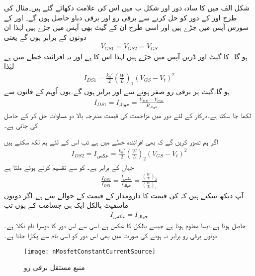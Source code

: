 شکل  الف میں  کا سادہ دور اور شکل  ب میں اس کی علامت دکھائے گئے ہیں۔مثال  کی طرح  اور  کے دور کو حل کرنے سے برقی رو  اور برقی دباو  حاصل ہوں گے۔ اور  کے سورس آپس میں جڑے ہیں اور اسی طرح ان کے گیٹ بھی آپس میں جڑے ہیں لہٰذا ان دونوں کے  برابر ہوں گے یعنی
\begin{align*}
V_{GS1}=V_{GS2}=V_{GS}
\end{align*}
ہو گا۔ کا گیٹ اور ڈرین آپس میں جڑے ہیں لہٰذا اس کا  ہے اور یہ افزائندہ خطے میں ہے لہٰذا
\begin{align}\label{مساوات_ماسفیٹ_مستقل_برقی_رو_الف}
I_{DS1}=\frac{k_n'}{2} \left(\frac{W}{L}\right)_1 \left(V_{GS}-V_t \right)^2
\end{align}
ہو گا۔گیٹ پر برقی رو صفر ہونے سے  اور  برابر ہوں گے۔یوں اُوہم کے قانون سے
\begin{align}\label{مساوات_ماسفیٹ_مستقل_برقی_رو_ب}
I_{DS1}=I_{\text{حوالہ}}=\frac{V_{DD}-V_{GS1}}{R_{\text{حوالہ}}}
\end{align}
لکھا جا سکتا ہے۔درکار  کے لئے دور میں مزاحمت  کی قیمت مندرجہ بالا دو مساوات حل کر کے  حاصل کی جاتی ہے۔

اگر ہم تصور کریں گے کہ  بھی افزائندہ خطے میں ہے تب اس کے لئے ہم لکھ سکتے ہیں
\begin{align}
I_{DS2}=I_{\text{عکس}}=\frac{k_n'}{2} \left(\frac{W}{L}\right)_2 \left(V_{GS}-V_t \right)^2
\end{align} 
جہاں  کے برابر ہے۔ کو  سے تقسیم کرتے ہوئے ملتا ہے
\begin{align}
\frac{I_{DS2}}{I_{DS1}}=\frac{I_{\text{عکس}}}{I_{\text{حوالہ}}}=\frac{\left(\frac{W}{L} \right)_2}{\left(\frac{W}{L} \right)_1}
\end{align}
آپ دیکھ سکتے ہیں کہ  کی قیمت کا دارومدار  کے قیمت کے حوالے سے ہے۔اگر دونوں ماسفیٹ بالکل ایک ہی جسامت کے ہوں تب
\begin{align}
I_{\text{عکس}}=I_{\text{حوالہ}}
\end{align}
حاصل ہوتا ہے۔ایسا معلوم ہوتا ہے جیسے  بالکل  کا عکس ہے۔اسی سے اس دور کا دوسرا نام  نکلا ہے۔دونوں برقی رو برابر نہ ہونے کی صورت میں بھی اس دور کو اسی نام سے پکارا جاتا ہے۔
\begin{figure}
\centering
\texttt{[image: nMosfetConstantCurrentSource]}
\caption{منبع مستقل برقی رو}
\label{شکل_ماسفیٹ_پیداکار_مستقل_برقی_رو}
\end{figure}

